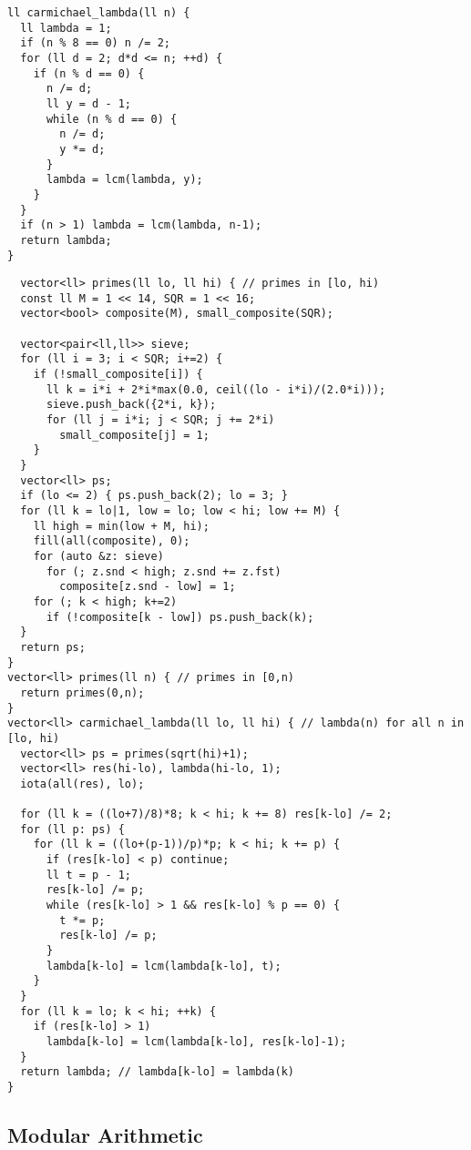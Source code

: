 \begin{lstlisting}
ll carmichael_lambda(ll n) {
  ll lambda = 1;
  if (n % 8 == 0) n /= 2;
  for (ll d = 2; d*d <= n; ++d) {
    if (n % d == 0) {
      n /= d;
      ll y = d - 1;
      while (n % d == 0) {
        n /= d;
        y *= d;
      }
      lambda = lcm(lambda, y);
    }
  }
  if (n > 1) lambda = lcm(lambda, n-1);
  return lambda;
}
\end{lstlisting}
\newpage
\begin{lstlisting}
  vector<ll> primes(ll lo, ll hi) { // primes in [lo, hi)
  const ll M = 1 << 14, SQR = 1 << 16;
  vector<bool> composite(M), small_composite(SQR);

  vector<pair<ll,ll>> sieve; 
  for (ll i = 3; i < SQR; i+=2) {
    if (!small_composite[i]) {
      ll k = i*i + 2*i*max(0.0, ceil((lo - i*i)/(2.0*i)));
      sieve.push_back({2*i, k});
      for (ll j = i*i; j < SQR; j += 2*i) 
        small_composite[j] = 1;
    }
  }
  vector<ll> ps; 
  if (lo <= 2) { ps.push_back(2); lo = 3; }
  for (ll k = lo|1, low = lo; low < hi; low += M) {
    ll high = min(low + M, hi);
    fill(all(composite), 0);
    for (auto &z: sieve) 
      for (; z.snd < high; z.snd += z.fst)
        composite[z.snd - low] = 1;
    for (; k < high; k+=2) 
      if (!composite[k - low]) ps.push_back(k);
  }
  return ps;
}
vector<ll> primes(ll n) { // primes in [0,n)
  return primes(0,n);
}
vector<ll> carmichael_lambda(ll lo, ll hi) { // lambda(n) for all n in [lo, hi)
  vector<ll> ps = primes(sqrt(hi)+1);
  vector<ll> res(hi-lo), lambda(hi-lo, 1);
  iota(all(res), lo);

  for (ll k = ((lo+7)/8)*8; k < hi; k += 8) res[k-lo] /= 2;
  for (ll p: ps) {
    for (ll k = ((lo+(p-1))/p)*p; k < hi; k += p) {
      if (res[k-lo] < p) continue;
      ll t = p - 1;
      res[k-lo] /= p;
      while (res[k-lo] > 1 && res[k-lo] % p == 0) {
        t *= p;
        res[k-lo] /= p; 
      }
      lambda[k-lo] = lcm(lambda[k-lo], t);
    }
  }
  for (ll k = lo; k < hi; ++k) {
    if (res[k-lo] > 1) 
      lambda[k-lo] = lcm(lambda[k-lo], res[k-lo]-1);
  }
  return lambda; // lambda[k-lo] = lambda(k)
}
\end{lstlisting}

\newpage
\subsection{Modular Arithmetic}

